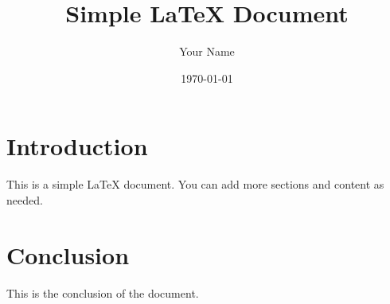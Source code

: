 \documentclass{article}
\begin{document}
\title{Simple LaTeX Document}
\author{Your Name}
\date{\today}

\maketitle

\section{Introduction}

This is a simple LaTeX document. You can add more sections and content as needed.

\section{Conclusion}

This is the conclusion of the document.
\end{document}

